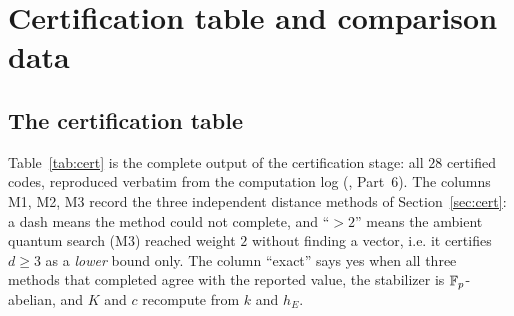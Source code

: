 \appendix
\section{Certification table and comparison data}
\label{app:tables}

\subsection{The certification table}

Table~\ref{tab:cert} is the complete output of the certification stage: all
$28$ certified codes, reproduced verbatim from the computation log
(, Part~6). The
columns M1, M2, M3 record the three independent distance methods of
Section~\ref{sec:cert}: a dash means the method could not complete, and
``$>2$'' means the ambient quantum search (M3) reached weight $2$ without
finding a vector, i.e. it certifies $d\ge3$ as a \emph{lower} bound only.
The column ``exact'' says yes when all three methods that completed agree
with the reported value, the stabilizer is $\mathbb F_p$-abelian, and $K$ and $c$
recompute from $k$ and $h_E$.

